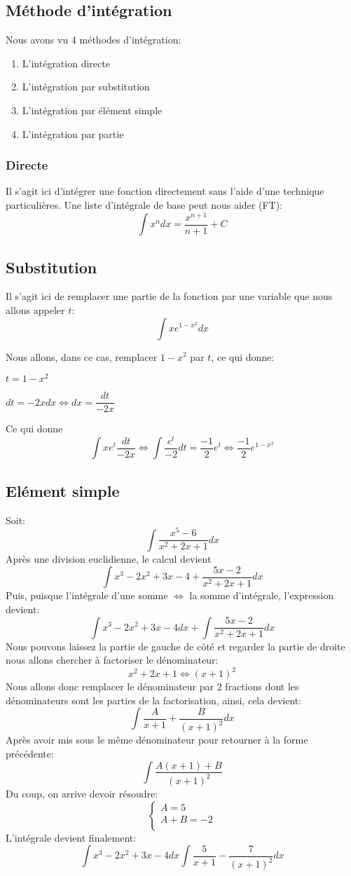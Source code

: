 \documentclass[12pt,a4paper]{report}
\begin{document}
	\subsection*{Méthode d'intégration}
	
	Nous avons vu 4 méthodes d'intégration:
	\begin{enumerate}
		\item L'intégration directe
		\item L'intégration par substitution
		\item L'intégration par élément simple
		\item L'intégration par partie
	\end{enumerate}
	\subsubsection*{Directe}
	Il s'agit ici d'intégrer une fonction directement sans l'aide d'une technique particulières. Une liste d'intégrale de base peut nous aider (FT):\[\int x^n dx=\dfrac{x^{n+1}}{n+1} +C\]
	\subsection*{Substitution}
	Il s'agit ici de remplacer une partie de la fonction par une variable que nous allons appeler $t$:\[\int xe^{1-x^2}dx\]
	
	Nous allons, dans ce cas, remplacer $1-x^2$ par $t$, ce qui donne:
	
	\medskip
	$t=1-x^2$
	
	$dt=-2xdx \Leftrightarrow dx=\dfrac{dt}{-2x}$
	\smallskip
	
	Ce qui donne \[\int xe^t \frac{dt}{-2x} \Leftrightarrow \int \frac{e^t}{-2}dt = \frac{-1}{2}e^t \Leftrightarrow \frac{-1}{2}e^{1-x^2} \]
	
	\subsection{Elément simple}
	
	Soit: \[ \int \dfrac{x^5-6}{x^2+2x+1}dx \] Après une division euclidienne, le calcul devient \[\int x^3-2x^2+3x-4 + \dfrac{5x-2}{x^2+2x+1}dx\]
	Puis, puisque l'intégrale d'une somme $\Leftrightarrow$ la somme d'intégrale, l'expression devient: \[ \int x^3-2x^2+3x-4 dx + \int \dfrac{5x-2}{x^2+2x+1}dx \]
 	Nous pouvons laissez la partie de gauche de côté et regarder la partie de droite nous allons chercher à factoriser le dénominateur: \[x^2+2x+1 \Leftrightarrow (x+1)^2 \]
 	Nous allons donc remplacer le dénominateur par 2 fractions dont les dénominateurs sont les parties de la factorisation, ainsi, cela devient:
 	\[ \int \dfrac{A}{x+1}+\dfrac{B}{(x+1)^2}dx \]
 	Après avoir mis sous le même dénominateur pour retourner à la forme précédente:
 	\[\int \dfrac{A(x+1)+B}{(x+1)^2} \] 
 	Du coup, on arrive devoir résoudre:
 	\[\left\{
 	\begin{array}{l}
 	 A=5 \\
 	 A+B=-2 \\
 	\end{array}
 	\right. \]
 	L'intégrale devient finalement: \[ \int x^3-2x^2+3x-4dx \int \dfrac{5}{x+1}- \dfrac{7}{(x+1)^2}dx \]
\end{document}
